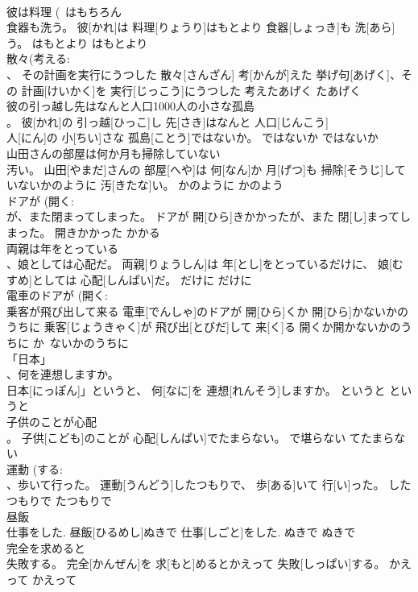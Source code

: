\documentclass[8pt]{extreport}
\begin{document}
\begin{CJK}{UTF8}{min}
\\	彼は料理 (~はもちろん 
\\	食器も洗う。	彼[かれ]は 料理[りょうり]はもとより 食器[しょっき]も 洗[あら]う。	はもとより	はもとより	
\\	散々(考える: 
\\	、 その計画を実行にうつした	散々[さんざん] 考[かんが]えた 挙げ句[あげく]、その 計画[けいかく]を 実行[じっこう]にうつした	考えたあげく	たあげく	
\\	彼の引っ越し先はなんと人口1000人の小さな孤島 
\\	。	彼[かれ]の 引っ越[ひっこ]し 先[さき]はなんと 人口[じんこう] 
\\	人[にん]の 小[ちい]さな 孤島[ことう]ではないか。	ではないか	ではないか	
\\	山田さんの部屋は何か月も掃除していない 
\\	汚い。	山田[やまだ]さんの 部屋[へや]は 何[なん]か 月[げつ]も 掃除[そうじ]していないかのように 汚[きたな]い。	かのように	かのよう	
\\	ドアが (開く: 
\\	が、また閉まってしまった。	ドアが 開[ひら]きかかったが、また 閉[し]まってしまった。	開きかかった	かかる	
\\	両親は年をとっている
\\	、娘としては心配だ。	両親[りょうしん]は 年[とし]をとっているだけに、 娘[むすめ]としては 心配[しんぱい]だ。	だけに	だけに	
\\	電車のドアが (開く: 
\\	乗客が飛び出して来る	電車[でんしゃ]のドアが 開[ひら]くか 開[ひら]かないかのうちに 乗客[じょうきゃく]が 飛び出[とびだ]して 来[く]る	開くか開かないかのうちに	か~ないかのうちに	
\\	「日本」
\\	、何を連想しますか。	
\\	日本[にっぽん]」というと、 何[なに]を 連想[れんそう]しますか。	というと	というと	
\\	子供のことが心配 
\\	。	子供[こども]のことが 心配[しんぱい]でたまらない。	で堪らない	てたまらない	
\\	運動 (する: 
\\	、歩いて行った。	運動[うんどう]したつもりで、 歩[ある]いて 行[い]った。	したつもりで	たつもりで	
\\	昼飯 
\\	仕事をした.	昼飯[ひるめし]ぬきで 仕事[しごと]をした.	ぬきで	ぬきで	
\\	完全を求めると 
\\	失敗する。	完全[かんぜん]を 求[もと]めるとかえって 失敗[しっぱい]する。	かえって	かえって~	

\end{CJK}
\end{document}
